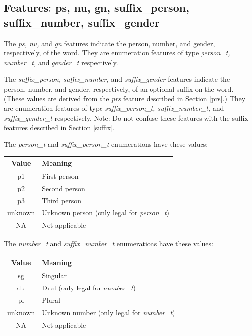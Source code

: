 \documentclass[11pt,oneside,a4paper]{memoir}
\begin{document}
\subsection{Features: ps, nu, gn, suffix\_person, suffix\_number, suffix\_gender}\label{suffix-gram}

The \emph{ps, nu,} and \emph{gn} features indicate the person, number, and gender, respectively, of
the word. They are enumeration features of type \emph{person\_t, number\_t,} and \emph{gender\_t}
respectively.

The \emph{suffix\_person, suffix\_number,} and \emph{suffix\_gender} features indicate the person,
number, and gender, respectively, of an optional suffix on the word. (These values are derived from
the \emph{prs} feature described in Section \ref{prs}.) They are enumeration
features of type \emph{suffix\_person\_t, suffix\_number\_t,} and \emph{suffix\_gender\_t}
respectively. Note: Do not confuse these features with the suffix features described in Section
\ref{suffix}.

The \emph{person\_t} and \emph{suffix\_person\_t} enumerations have these values:

\begin{center}
  \begin{tabular}{cl}
    \textbf{Value} & \textbf{Meaning}\\
    \hline
    p1 & First person\\
    p2 & Second person\\
    p3 & Third person\\
    unknown & Unknown person (only legal for \emph{person\_t})\\
    NA & Not applicable\\
  \end{tabular}
\end{center}

The \emph{number\_t} and \emph{suffix\_number\_t} enumerations have these values:

\begin{center}
  \begin{tabular}{cl}
    \textbf{Value} & \textbf{Meaning}\\
    \hline
    sg & Singular\\
    du & Dual (only legal for \emph{number\_t})\\
    pl & Plural\\
    unknown & Unknown number (only legal for \emph{number\_t})\\
    NA & Not applicable\\
  \end{tabular}
\end{center}
\end{document}
